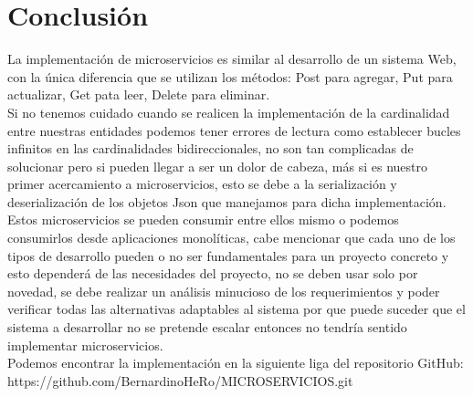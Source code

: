 \section{Conclusión}
La implementación de microservicios es similar al desarrollo de un sistema Web, con la única diferencia que se utilizan los métodos:  Post para agregar, Put para actualizar, Get pata leer, Delete para eliminar.\\
Si no tenemos cuidado cuando se realicen la implementación de la cardinalidad entre nuestras entidades podemos tener errores de lectura como establecer bucles infinitos en las cardinalidades bidireccionales, no son tan complicadas de solucionar pero si pueden llegar a ser un dolor de cabeza, más si es nuestro primer acercamiento a microservicios, esto se debe a la serialización y deserialización de los objetos Json que manejamos para dicha implementación.\\
Estos microservicios se pueden consumir entre ellos mismo o podemos consumirlos desde aplicaciones monolíticas, cabe mencionar que cada uno de los tipos de desarrollo pueden o no ser fundamentales para un proyecto concreto y esto dependerá de las necesidades del proyecto, no se deben usar solo por novedad, se debe realizar un análisis minucioso de los requerimientos y poder verificar todas las alternativas adaptables al sistema por que puede suceder que el sistema a desarrollar no se pretende escalar entonces no tendría sentido implementar microservicios.\\


Podemos encontrar la implementación en la siguiente liga del repositorio GitHub:\\ https://github.com/BernardinoHeRo/MICROSERVICIOS.git